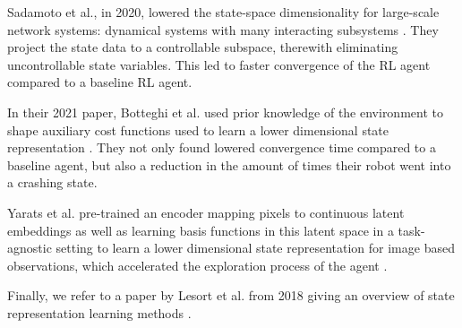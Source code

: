 Sadamoto et al., in 2020, lowered the state-space dimensionality for large-scale network systems: dynamical systems with many interacting subsystems \cite{project_matrix}. They project the state data to a controllable subspace, therewith eliminating uncontrollable state variables. This led to faster convergence of the RL agent compared to a baseline RL agent.

In their 2021 paper, Botteghi et al. used prior knowledge of the environment to shape auxiliary cost functions used to learn a lower dimensional state representation \cite{priors}. They not only found lowered convergence time compared to a baseline agent, but also a reduction in the amount of times their robot went into a crashing state.

Yarats et al. pre-trained an encoder mapping pixels to continuous latent embeddings as well as learning basis functions in this latent space in a task-agnostic setting to learn a lower dimensional state representation for image based observations, which accelerated the exploration process of the agent \cite{prototypical}.

Finally, we refer to a paper by Lesort et al. from 2018 giving an overview of state representation learning methods \cite{representation_overview}.

